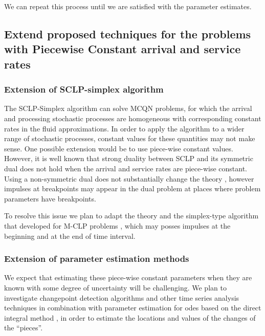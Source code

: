 \documentclass[11pt,a4paper,titlepage]{article}
\theoremstyle{definition}
\theoremstyle{plain}
\begin{document}
    We can repeat this process until we are satisfied with the parameter estimates.



    \subsection{Extend proposed techniques for the problems with Piecewise Constant arrival and service rates}
    \label{subsec:topics:sclp-piecewise}
    \subsubsection{Extension of SCLP-simplex algorithm}
    The SCLP-Simplex algorithm can solve MCQN problems,
    for which the arrival and processing stochastic processes are homogeneous
    with corresponding constant rates in the fluid approximations.
    In order to apply the algorithm to a wider range of stochastic processes,
    constant values for these quantities may not make sense.
    One possible extension would be to use piece-wise constant values.
    However,
    it is well known that strong duality between SCLP and its symmetric dual does not hold when the arrival and service rates are piece-wise constant.
    Using a non-symmetric dual does not substantially change the theory \autocite{pullan1993algorithm,shapiro2001duality},
    however impulses at breakpoints may appear in the dual problem at places where problem parameters have breakpoints.

    To resolve this issue we plan to adapt the theory and the simplex-type algorithm that developed for M-CLP problems \autocite{shindin2014symmetric,shindin2015structure,shindin2020simplex}, which may posses impulses at the beginning and at the end of time interval.

    \subsubsection{Extension of parameter estimation methods}
    We expect that estimating these piece-wise constant parameters when they are known with some degree of uncertainty will be challenging.
    We plan to investigate changepoint detection algorithms and other time series analysis techniques in combination with parameter estimation for \glspl{ode} based on the direct integral method \autocite{dattner2015optimal,dattner2015model,yaari2018simode}, in order to estimate the locations and values of the changes of the ``pieces''.
\end{document}
